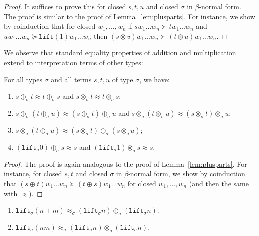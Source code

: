 \documentclass[runningheads,a4paper]{llncs}
\newcommand{\lift}{\mathtt{lift}}
\begin{document}
\begin{proof}
  It suffices to prove this for closed $s,t,u$ and closed $\sigma$ in
  $\beta$-normal form. The proof is similar to the proof of
  Lemma~\ref{lem:plusparts}. For instance, we show by coinduction that
  for closed $w_1,\ldots,w_n$ if $s w_1 \ldots w_n \succ t w_1 \ldots
  w_n$ and $u w_1 \ldots w_n \succeq \lift(1) w_1 \ldots w_n$ then $(s
  \otimes u) w_1 \ldots w_n \succ (t \otimes u) w_1 \ldots w_n$.
\end{proof}

We observe that standard equality properties of addition and
multiplication extend to interpretation terms of other types:

\begin{lemma}\label{lem:approxproperties}
For all types $\sigma$ and all terms $s,t,u$ of type $\sigma$, we
have:
\begin{enumerate}
\item\label{lem:approx:symmetry} $s \oplus_\sigma t \approx t
  \oplus_\sigma s$ and $s \otimes_\sigma t \approx t \otimes_\sigma
  s$;
\item\label{lem:approx:assoc} $s \oplus_\sigma (t \oplus_\sigma u)
  \approx (s \oplus_\sigma t) \oplus_\sigma u$ and $s \otimes_\sigma
  (t \otimes_\sigma u) \approx (s \otimes_\sigma t) \otimes_\sigma u$;
\item\label{lem:approx:distribution} $s \otimes_\sigma (t
  \oplus_\sigma u) \approx (s \otimes_\sigma t) \oplus_\sigma (s
  \otimes_\sigma u)$;
\item\label{lem:approx:neutral} $(\lift_\sigma 0) \oplus_\sigma s
  \approx s$ and $(\lift_\sigma 1) \otimes_\sigma s \approx s$.
\end{enumerate}
\end{lemma}

\begin{proof}
  The proof is again analogous to the proof of
  Lemma~\ref{lem:plusparts}. For instance, for closed $s,t$ and closed
  $\sigma$ in $\beta$-normal form, we show by coinduction that $(s
  \oplus t) w_1 \ldots w_n \succeq (t \oplus s) w_1 \ldots w_n$ for
  closed $w_1,\ldots,w_n$ (and then the same with $\preceq$).
\end{proof}

\begin{lemma}\label{lem:liftsplit}
  \begin{enumerate}
  \item $\lift_\sigma(n+m) \approx_\sigma (\lift_\sigma n)
    \oplus_\sigma (\lift_\sigma n)$.
  \item $\lift_\sigma(n m) \approx_\sigma (\lift_\sigma n)
    \otimes_\sigma (\lift_\sigma n)$.
  \end{enumerate}
\end{lemma}
\end{document}
